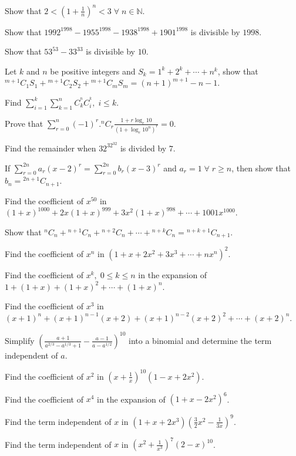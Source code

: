 \item Show that $2<\left(1 + \frac{1}{n}\right)^n < 3\;\forall\;n\in\mathbb{N}$.
\item Show that $1992^{1998} - 1955^{1998} - 1938^{1998} + 1901^{1998}$ is divisible by $1998$.
\item Show that $53^{53} - 33^{33}$ is divisible by $10$.
\item Let $k$ and $n$ be positive integers and $S_k = 1^k + 2^k + \cdots + n^k$, show that ${}^{m+1}C_1S_1 + {}^{m+1}C_2S_2 + {}^{m
  + 1}C_mS_m = (n + 1)^{m + 1} - n - 1$.
\item Find $\displaystyle\sum_{i=1}^k\sum_{k=1}^nC_k^^nC_i^^k,\;i\leq k$.
\item Prove that $\displaystyle\sum_{r=0}^n(-1)^r.{}^nC_r\frac{1 + r\log_e10}{(1 + \log_e10^n)^r} = 0$.
\item Find the remainder when $32^{32^{32}}$ is divided by $7$.
\item If $\displaystyle\sum_{r=0}^{2n}a_r(x - 2)^r = \sum_{r=0}^{2n}b_r(x - 3)^r$ and $a_r = 1\;\forall\;r\geq n$, then show that
  $b_n = {}^{2n + 1}C_{n + 1}$.
\item Find the coefficient of $x^{50}$ in $(1 + x)^{1000} + 2x(1 + x)^{999} + 3x^2(1 + x)^{998}+ \cdots + 1001x^{1000}$.
\item Show that ${}^nC_n + {}^{n + 1}C_n + {}^{n + 2}C_n + \cdots + {}^{n + k}C_n = {}^{n + k + 1}C_{n + 1}$.
\item Find the coefficient of $x^n$ in $(1 + x + 2x^2 + 3x^3 + \cdots + nx^n)^2$.
\item Find the coefficient of $x^k,\;0\leq k\leq n$ in the expansion of $1 + (1 + x) + (1 + x)^2 + \cdots + (1 + x)^n$.
\item Find the coefficient of $x^3$ in $(x + 1)^n + (x + 1)^{n- 1}(x + 2) + (x + 1)^{n - 2}(x + 2)^2 + \cdots + (x + 2)^n$.
\item Simplify $\left(\frac{a + 1}{a^{2/3} - a^{1/3} + 1} - \frac{a - 1}{a - a^{1/2}}\right)^{10}$ into a binomial and determine
  the term independent of $a$.
\item Find the coefficient of $x^2$ in $\left(x + \frac{1}{x}\right)^{10}(1 - x + 2x^2)$.
\item Find the coefficient of $x^4$ in the expansion of $(1 + x - 2x^2)^6$.
\item Find the term independent of $x$ in $(1 + x + 2x^3)\left(\frac{3}{2}x^2 - \frac{1}{3x}\right)^9$.
\item Find the term independent of $x$ in $\left(x^2 + \frac{1}{x^3}\right)^7(2 - x)^{10}$.
